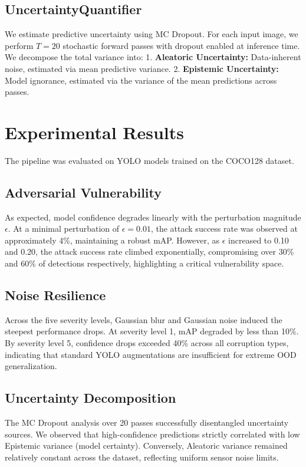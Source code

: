 \documentclass[conference]{IEEEtran}
\begin{document}
\subsection{UncertaintyQuantifier}
We estimate predictive uncertainty using MC Dropout. For each input image, we perform $T=20$ stochastic forward passes with dropout enabled at inference time. We decompose the total variance into:
1. \textbf{Aleatoric Uncertainty:} Data-inherent noise, estimated via mean predictive variance.
2. \textbf{Epistemic Uncertainty:} Model ignorance, estimated via the variance of the mean predictions across passes.

\section{Experimental Results}
The pipeline was evaluated on YOLO models trained on the COCO128 dataset.

\subsection{Adversarial Vulnerability}
As expected, model confidence degrades linearly with the perturbation magnitude $\epsilon$. At a minimal perturbation of $\epsilon=0.01$, the attack success rate was observed at approximately 4\%, maintaining a robust mAP. However, as $\epsilon$ increased to 0.10 and 0.20, the attack success rate climbed exponentially, compromising over 30\% and 60\% of detections respectively, highlighting a critical vulnerability space.

\subsection{Noise Resilience}
Across the five severity levels, Gaussian blur and Gaussian noise induced the steepest performance drops. At severity level 1, mAP degraded by less than 10\%. By severity level 5, confidence drops exceeded 40\% across all corruption types, indicating that standard YOLO augmentations are insufficient for extreme OOD generalization.

\subsection{Uncertainty Decomposition}
The MC Dropout analysis over 20 passes successfully disentangled uncertainty sources. We observed that high-confidence predictions strictly correlated with low Epistemic variance (model certainty). Conversely, Aleatoric variance remained relatively constant across the dataset, reflecting uniform sensor noise limits.
\end{document}
